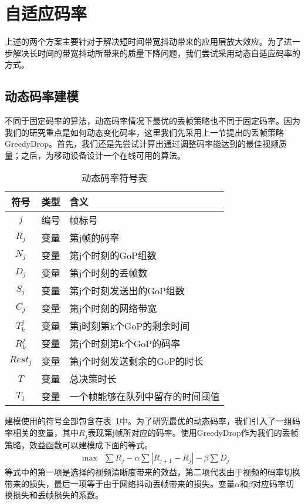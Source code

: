 \section{自适应码率}
上述的两个方案主要针对于解决短时间带宽抖动带来的应用层放大效应。为了进一步解决长时间的带宽抖动所带来的质量下降问题，我们尝试采用动态自适应码率的方式。
\subsection{动态码率建模}
不同于固定码率的算法，动态码率情况下最优的丢帧策略也不同于固定码率。因为我们的研究重点是如何动态变化码率，这里我们先采用上一节提出的丢帧策略GreedyDrop。首先，我们还是先尝试计算出通过调整码率能达到的最佳视频质量；之后，为移动设备设计一个在线可用的算法。

\begin{table}[tb]
\centering
\caption{动态码率符号表}
\label{vbr_vbr}
{\setlength{\tabcolsep}{3pt}
\begin{tabular}{|c|c|l|}
\hline
\textbf{符号} & \textbf{类型} & \textbf{含义}                      \\ \hline
$j$               & 编号         & 帧标号                            \\ \hline
$R_j$             & 变量      & 第j帧的码率 \\ \hline
$N_j$             & 变量      & 第j个时刻的GoP组数     \\ \hline
$D_j$             & 变量      & 第j个时刻的丢帧数  \\ \hline
$S_j$             & 变量   & 第j个时刻发送出的GoP组数 \\ \hline
$C_j$              & 变量         & 第j个时刻的网络带宽           \\ \hline
$T_k^j$               & 变量         & 第j时刻第k个GoP的剩余时间  \\ \hline
$R_k^j$            & 变量         & 第j个时刻第k个GoP的码率  \\ \hline
$Rest_j$       & 变量 & 第j个时刻发送剩余的GoP的时长 \\ \hline
$T$               & 变量         & 总决策时长                       \\ \hline
$T_1$               &变量          & 一个帧能够在队列中留存的时间阈值 \\
\hline\end{tabular}}
\end{table}

建模使用的符号全部包含在表~\ref{vbr_vbr}中。为了研究最优的动态码率，我们引入了一组码率相关的变量，其中$R_j$表现第j帧所对应的码率。使用GreedyDrop作为我们的丢帧策略，效益函数可以建模成下面的等式。
\begin{eqnarray}
&\max & \sum R_j- \alpha\sum|R_{j+1}-R_j|-\beta\sum D_j \nonumber
\label{vbr_obj}
\end{eqnarray}
等式中的第一项是选择的视频清晰度带来的效益，第二项代表由于视频的码率切换带来的损失，最后一项等于由于网络抖动丢帧带来的损失。变量$\alpha$和$\beta$对应码率切换损失和丢帧损失的系数。

